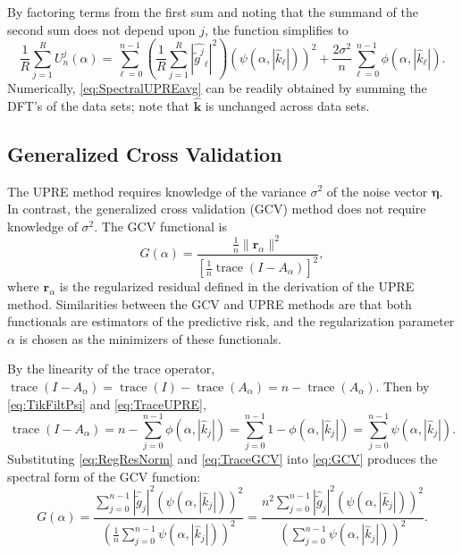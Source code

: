 \documentclass[12pt]{article}
\newcommand{\gnoise}{\widetilde{g}}	%
\newcommand{\kVec}{\mathbf{k}}	%
\newcommand{\trace}{\operatorname{trace}}	%
\newcommand{\regparam}{\alpha}
\newcommand{\filt}{\phi}
\newcommand{\mfilt}{\psi}
\newcommand{\noise}{\eta}	%
\newcommand{\noiseSD}{\sigma}	%
\newcommand{\noiseVec}{\bm{\noise}}	%
\newcommand{\regres}{\mathbf{r}_{\regparam}}	%
\newcommand{\A}{A_{\regparam}}	%
\newcommand{\U}{U}	%
\newcommand{\GCV}{G}	%
\begin{document}
By factoring terms from the first sum and noting that the summand of the second sum does not depend upon $j$, the function simplifies to
\begin{equation}
\frac{1}{R}\sum_{j=1}^R \U_n^j(\regparam) =  \sum_{\ell = 0}^{n-1} \left(\frac{1}{R}\sum_{j=1}^R |\widehat{\gnoise^j}_\ell|^2\right)(\mfilt(\regparam,|\widehat{k}_\ell|))^2 + \frac{2\noiseSD^2}{n}\sum_{\ell = 0}^{n-1} \filt(\regparam,|\widehat{k}_\ell|).
\label{eq:SpectralUPREavg}
\end{equation}
Numerically, \eqref{eq:SpectralUPREavg} can be readily obtained by summing the DFT's of the data sets; note that $\widehat{\kVec}$ is unchanged across data sets.

\subsection{Generalized Cross Validation} \label{sec:Generalized Cross Validation}
The UPRE method requires knowledge of the variance $\noiseSD^2$ of the noise vector $\noiseVec$. In contrast, the generalized cross validation (GCV) method does not require knowledge of $\noiseSD^2$. The GCV functional is
\begin{equation}
\label{eq:GCV}
\GCV(\regparam) = \frac{\frac{1}{n}\|\regres\|^2}{\left[\frac{1}{n}\trace(I-\A)\right]^2},
\end{equation}
where $\regres$ is the regularized residual defined in the derivation of the UPRE method. Similarities between the GCV and UPRE methods are that both functionals are estimators of the predictive risk, and the regularization parameter $\regparam$ is chosen as the minimizers of these functionals. \par 
By the linearity of the trace operator, $\trace(I-\A) = \trace(I)-\trace(\A) = n - \trace(\A)$. Then by \eqref{eq:TikFiltPsi} and \eqref{eq:TraceUPRE},
\begin{equation}
\trace(I-\A) = n - \sum_{j = 0}^{n-1} \filt(\regparam,|\widehat{k}_j|) = \sum_{j = 0}^{n-1} 1 - \filt(\regparam,|\widehat{k}_j|) = \sum_{j = 0}^{n-1} \mfilt(\regparam,|\widehat{k}_j|).
\label{eq:TraceGCV}
\end{equation}
Substituting \eqref{eq:RegResNorm} and \eqref{eq:TraceGCV} into \eqref{eq:GCV} produces the spectral form of the GCV function:
\begin{equation}
\GCV(\regparam) = \frac{\sum_{j = 0}^{n-1} |\widehat{\gnoise}_j|^2(\mfilt(\regparam,|\widehat{k}_j|))^2}{(\frac{1}{n}\sum_{j = 0}^{n-1} \mfilt(\regparam,|\widehat{k}_j|))^2} = \frac{n^2\sum_{j = 0}^{n-1} |\widehat{\gnoise}_j|^2(\mfilt(\regparam,|\widehat{k}_j|))^2}{(\sum_{j = 0}^{n-1} \mfilt(\regparam,|\widehat{k}_j|))^2}.
\label{eq:SpectralGCV}
\end{equation} \par 
\end{document}
